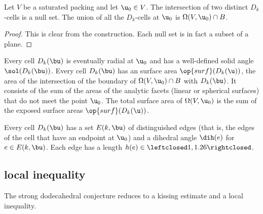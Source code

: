 \begin{lemma}[]
  Let $V$ be a saturated packing and let $\u_0\in V$.  The
  intersection of two distinct $D_k$-cells is a null set.  The union
  of all the $D_k$-cells at $\u_0$ is $\Omega(V, \u_0)\cap B$.
\end{lemma}
%

\begin{proof} This is clear from the construction.  Each null set is
  in fact a subset of a plane.
\end{proof}

Every cell $D_k(\bu)$ is eventually radial at $ \u_0$ and has a
well-defined solid angle $\sol(D_k(\bu))$.  Every cell $D_k(\bu)$ has
an  surface area $\op{surf}(D_k(\u))$,   the area
of the intersection of the boundary of $\Omega(V, \u_0)\cap B$ with
$D_k(\bu)$.  It consists of the sum of the areas of the analytic
facets (linear or spherical surfaces) that do not meet the point $
\u_0$.  The total surface area of $\Omega(V,\u_0)$ is the sum of the
exposed surface areas $\op{surf}(D_k(\u))$.  %
%
%
%


Every cell $D_k(\bu)$ has a set $E(k,\bu)$ of distinguished edges
(that is, the edges of the cell that have an endpoint at $\u_0$) and a
dihedral angle $\dih(e)$ for $e\in E(k,\bu)$.  Each edge has a length
$h(e)\in\leftclosed1,1.26\rightclosed$.  %
%
%
%

\subsection{local inequality}

The strong dodecahedral conjecture reduces to a kissing estimate and a
local inequality.  %


